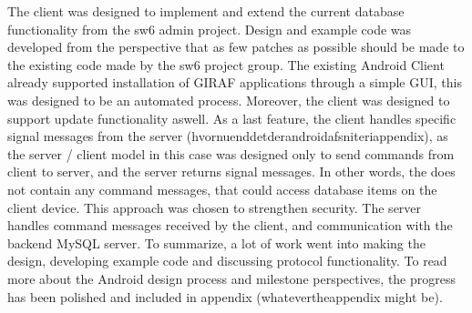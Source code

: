 The client was designed to implement and extend the current database functionality from the sw6 admin project. Design and example code was developed from the perspective that as few patches as possible should be made to the existing code made by the sw6 project group.
The existing Android Client already supported installation of GIRAF applications through a simple GUI, this  was designed to be an automated process. Moreover, the client was designed to support update functionality aswell. As a last feature, the client handles specific signal messages from the server \vrev(hvornuenddetderandroidafsniteriappendix), as the server / client model in this case was designed only to send commands from client to server, and the server returns signal messages. In other words, the does not contain any command messages, that could access database items on the client device. This approach was chosen to strengthen security.  
The server handles command messages received by the client, and communication with the backend MySQL server.
To summarize, a lot of work went into making the design, developing example code and discussing protocol functionality. To read more about the Android design process and milestone perspectives, the progress has been polished and included in appendix (whatevertheappendix might be).
